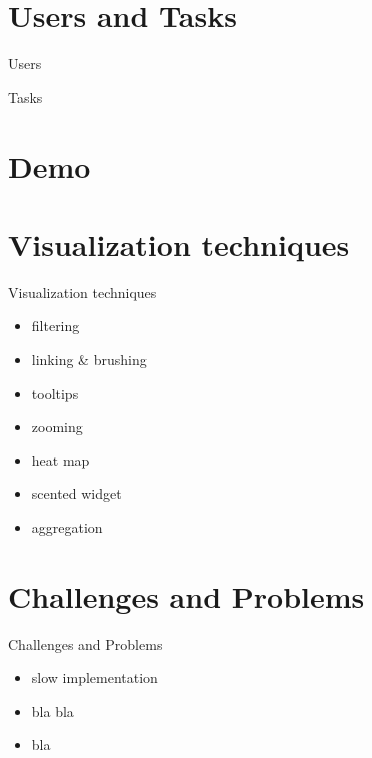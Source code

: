 \documentclass[naustrian]{beamer}
\begin{document}
\section{Users and Tasks}

\begin{frame}{Users}
\end{frame}

\begin{frame}{Tasks}
\end{frame}

{
\section{Demo}
}


\section{Visualization techniques}

\begin{frame}{Visualization techniques}
    \begin{itemize}
        \item filtering
        \item linking \& brushing
        \item tooltips
        \item zooming
        \item heat map
        \item scented widget
        \item aggregation
    \end{itemize}
\end{frame}

\section{Challenges and Problems}

\begin{frame}{Challenges and Problems}
    \begin{itemize}
        \item slow implementation
        \item bla bla
        \item bla
    \end{itemize}
\end{frame}
\end{document}
